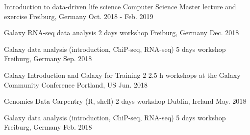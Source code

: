 



\begin{cvhonors}

  \cvhonor
    {Introduction to data-driven life science} %
    {Computer Science Master lecture and exercise} %
    {Freiburg, Germany} %
    {Oct. 2018 - Feb. 2019} %

  \cvhonor
    {Galaxy RNA-seq data analysis} %
    {2 days workshop} %
    {Freiburg, Germany} %
    {Dec. 2018} %

  \cvhonor
    {Galaxy data analysis (introduction, ChiP-seq, RNA-seq)} %
    {5 days workshop} %
    {Freiburg, Germany} %
    {Sep. 2018} %

\cvhonor
    {Galaxy Introduction and Galaxy for Training} %
    {2 2.5 h workshops at the Galaxy Community Conference} %
    {Portland, US} %
    {Jun. 2018} %

  \cvhonor
    {Genomics Data Carpentry (R, shell)} %
    {2 days workshop} %
    {Dublin, Ireland} %
    {May. 2018} %

  \cvhonor
    {Galaxy data analysis (introduction, ChiP-seq, RNA-seq)} %
    {5 days workshop} %
    {Freiburg, Germany} %
    {Feb. 2018} %

\end{cvhonors}

